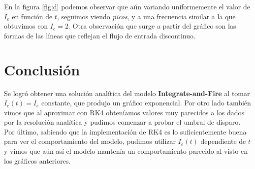 \documentclass [a4paper,12pt,oneside,final]{article}
\begin{document}
En la figura \ref{fig:d} podemos observar que aún variando uniformemente el valor de $I_e$ en función de $t$, seguimos viendo {\it picos}, y a una frecuencia similar a la que obtuvimos con $I_e = 2$. Otra observación que surge a partir del gráfico son las formas de las líneas que reflejan el flujo de entrada discontinuo.

\section{Conclusión}

Se logró obtener una solución analítica del modelo {\bf Integrate-and-Fire} al tomar $ I_e(t) = I_e $ constante, que produjo un gráfico exponencial. Por otro lado también vimos que al aproximar con RK4 obteníamos valores muy parecidos a los dados por la resolución analítica y pudimos comenzar a probar el umbral de disparo. Por último, sabiendo que la implementación de RK4 es lo suficientemente buena para ver el comportamiento del modelo, pudimos utilizar $ I_e(t) $ dependiente de $t$ y vimos que aún así el modelo mantenía un comportamiento parecido al visto en los gráficos anteriores.
\end{document}
